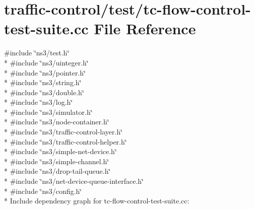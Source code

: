 \hypertarget{tc-flow-control-test-suite_8cc}{}\section{traffic-\/control/test/tc-\/flow-\/control-\/test-\/suite.cc File Reference}
\label{tc-flow-control-test-suite_8cc}
{\ttfamily \#include \char`\"{}ns3/test.\+h\char`\"{}}\\*
{\ttfamily \#include \char`\"{}ns3/uinteger.\+h\char`\"{}}\\*
{\ttfamily \#include \char`\"{}ns3/pointer.\+h\char`\"{}}\\*
{\ttfamily \#include \char`\"{}ns3/string.\+h\char`\"{}}\\*
{\ttfamily \#include \char`\"{}ns3/double.\+h\char`\"{}}\\*
{\ttfamily \#include \char`\"{}ns3/log.\+h\char`\"{}}\\*
{\ttfamily \#include \char`\"{}ns3/simulator.\+h\char`\"{}}\\*
{\ttfamily \#include \char`\"{}ns3/node-\/container.\+h\char`\"{}}\\*
{\ttfamily \#include \char`\"{}ns3/traffic-\/control-\/layer.\+h\char`\"{}}\\*
{\ttfamily \#include \char`\"{}ns3/traffic-\/control-\/helper.\+h\char`\"{}}\\*
{\ttfamily \#include \char`\"{}ns3/simple-\/net-\/device.\+h\char`\"{}}\\*
{\ttfamily \#include \char`\"{}ns3/simple-\/channel.\+h\char`\"{}}\\*
{\ttfamily \#include \char`\"{}ns3/drop-\/tail-\/queue.\+h\char`\"{}}\\*
{\ttfamily \#include \char`\"{}ns3/net-\/device-\/queue-\/interface.\+h\char`\"{}}\\*
{\ttfamily \#include \char`\"{}ns3/config.\+h\char`\"{}}\\*
Include dependency graph for tc-\/flow-\/control-\/test-\/suite.cc\+:
